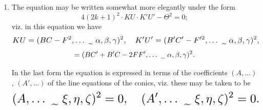 \documentclass[12pt,a4paper]{article}
\theoremstyle{plain}
\theoremstyle{definition}
\theoremstyle{remark}
\begin{document}
\begin{enumerate}[label=\arabic*.]
We then have
\[(a-b)^2 = (a+b)^2 - 4ab = -4\gamma^2 K(\alpha,\beta,\gamma)^2,\]
and similarly
\[(c-d)^2 = -4\gamma^2 K'(\alpha,\beta,\gamma)^2.\]

We have, moreover,
\begin{align*}
&(a+b)(c+d) - 2(ab+cd) \\
&\quad = 4(H\gamma^2 - F\alpha\gamma - G\beta\gamma + C\alpha\beta)(H'\gamma^2 - F'\alpha\gamma - G'\beta\gamma + C'\alpha\beta) \\
&\qquad - 2(B\gamma^2 - 2F\beta\gamma + C\beta^2)(A'\gamma^2 - 2G'\gamma\alpha + C'\alpha^2) \\
&\qquad - 2(B'\gamma^2 - 2F'\beta\gamma + C'\beta^2)(A\gamma^2 - 2G\gamma\alpha + C\alpha^2) \\
&\quad = -2\gamma^2(BC' + B'C - 2FF', \ldots \,\raisebox{-0.5ex}{\,\texttildelow\,}\, \alpha,\beta,\gamma)^2,
\end{align*}
and substituting the foregoing values, we find
\[
\resizebox{\textwidth}{!}{$\displaystyle 4(2k+1)^2 KK'(\alpha,\ldots \,\raisebox{-0.5ex}{\,\texttildelow\,}\, \alpha,\beta,\gamma)^2 - \{(BC' + B'C - 2FF', \ldots \,\raisebox{-0.5ex}{\,\texttildelow\,}\, \alpha,\beta,\gamma)^2\}^2 = 0, $}
\]
or putting for shortness
\[
\resizebox{\textwidth}{!}{$\displaystyle \Theta = (BC' + B'C - 2FF', GH' + G'H - AF' - A'F, \ldots \,\raisebox{-0.5ex}{\,\texttildelow\,}\, \alpha,\beta,\gamma)^2, $}
\]
the equation of the locus is
\[4(2k+1)^2 KK' \cdot UU' - \Theta^2 = 0,\]
where $(\alpha,\beta,\gamma)$ are current coordinates.

The locus is thus a quartic curve having quadruple contact with each of the conics $U = 0$, $U' = 0$; viz. it touches them at their points of intersection with the conic $\Theta = 0$, which is the locus of the point such that the four tangents form a harmonic pencil.

\item The equation may be written somewhat more elegantly under the form
\[4(2k+1)^2 \cdot KU \cdot K'U' - \Theta^2 = 0;\]
viz. in this equation we have
\[
\resizebox{\textwidth}{!}{$\displaystyle KU = (BC - F^2, \ldots \,\raisebox{-0.5ex}{\,\texttildelow\,}\, \alpha,\beta,\gamma)^2, \quad K'U' = (B'C' - F'^2, \ldots \,\raisebox{-0.5ex}{\,\texttildelow\,}\, \alpha,\beta,\gamma)^2, $}
\]
\[= (BC' + B'C - 2FF', \ldots \,\raisebox{-0.5ex}{\,\texttildelow\,}\, \alpha,\beta,\gamma)^2.\]

In the last form the equation is expressed in terms of the coefficients $(A,\ldots)$, $(A',\ldots)$ of the line equations of the conics, viz. these may be taken to be
\[
\resizebox{\textwidth}{!}{$\displaystyle (A,\ldots \,\raisebox{-0.5ex}{\,\texttildelow\,}\, \xi,\eta,\zeta)^2 = 0, \quad (A',\ldots \,\raisebox{-0.5ex}{\,\texttildelow\,}\, \xi,\eta,\zeta)^2 = 0. $}
\]


\end{enumerate}
\end{document}
